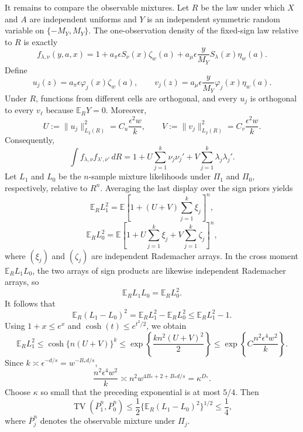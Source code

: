 It remains to compare the observable mixtures. Let \(R\) be the law under which \(X\) and \(A\) are independent uniforms and \(Y\) is an independent symmetric random variable on \(\{-M_Y,M_Y\}\). The one-observation density of the fixed-sign law relative to \(R\) is exactly
\[
f_{\lambda,\nu}(y,a,x)
=
1+a_\pi\epsilon S_\nu(x)\zeta_w(a)
+a_\mu\epsilon\frac{y}{M_Y}S_\lambda(x)\eta_w(a).
\]
Define
\[
u_j(z)=a_\pi\epsilon\varphi_j(x)\zeta_w(a),
\qquad
v_j(z)=a_\mu\epsilon\frac{y}{M_Y}\varphi_j(x)\eta_w(a).
\]
Under \(R\), functions from different cells are orthogonal, and every \(u_j\) is orthogonal to every \(v_\ell\) because \(\mathbb E_RY=0\). Moreover,
\[
U:=\lVert u_j\rVert_{L_2(R)}^2=C_u\frac{\epsilon^2w}{k},
\qquad
V:=\lVert v_j\rVert_{L_2(R)}^2=C_v\frac{\epsilon^2w}{k}.
\]
Consequently,
\[
\int f_{\lambda,\nu}f_{\lambda',\nu'}\,dR
=
1+U\sum_{j=1}^k\nu_j\nu_j'
+V\sum_{j=1}^k\lambda_j\lambda_j'.
\]
Let \(L_1\) and \(L_0\) be the \(n\)-sample mixture likelihoods under \(\Pi_1\) and \(\Pi_0\), respectively, relative to \(R^n\). Averaging the last display over the sign priors yields
\[
\mathbb E_RL_1^2
=
\mathbb E\left[1+(U+V)\sum_{j=1}^k\xi_j\right]^n,
\]
\[
\mathbb E_RL_0^2
=
\mathbb E\left[1+U\sum_{j=1}^k\xi_j+V\sum_{j=1}^k\zeta_j\right]^n,
\]
where \((\xi_j)\) and \((\zeta_j)\) are independent Rademacher arrays. In the cross moment \(\mathbb E_RL_1L_0\), the two arrays of sign products are likewise independent Rademacher arrays, so
\[
\mathbb E_RL_1L_0=\mathbb E_RL_0^2.
\]
It follows that
\[
\mathbb E_R(L_1-L_0)^2
=
\mathbb E_RL_1^2-\mathbb E_RL_0^2
\le
\mathbb E_RL_1^2-1.
\]
Using \(1+x\le e^x\) and \(\cosh(t)\le e^{t^2/2}\), we obtain
\[
\mathbb E_RL_1^2
\le
\cosh\{n(U+V)\}^k
\le
\exp\left\{\frac{k n^2(U+V)^2}{2}\right\}
\le
\exp\left\{C\frac{n^2\epsilon^4w^2}{k}\right\}.
\]
Since \(k\asymp\epsilon^{-d/s}=w^{-B_*d/s}\),
\[
\frac{n^2\epsilon^4w^2}{k}
\asymp
n^2w^{4B_*+2+B_*d/s}
=
\kappa^{D_*}.
\]
Choose \(\kappa\) so small that the preceding exponential is at most \(5/4\). Then
\[
\operatorname{TV}(\overline P_1^n,\overline P_0^n)
\le
\frac12\{\mathbb E_R(L_1-L_0)^2\}^{1/2}
\le\frac14,
\]
where \(\overline P_j^n\) denotes the observable mixture under \(\Pi_j\).

